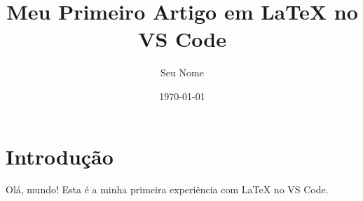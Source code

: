 \documentclass{article}
\title{Meu Primeiro Artigo em LaTeX no VS Code}
\author{Seu Nome}
\date{\today}
\begin{document}
\maketitle

\section{Introdução}
Olá, mundo! Esta é a minha primeira experiência com LaTeX no VS Code.
\end{document}
